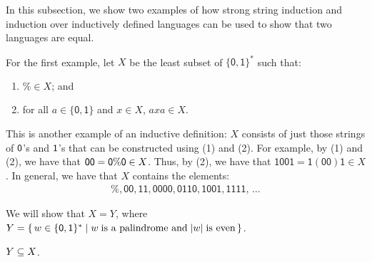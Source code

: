 In this subsection, we show two examples of how strong string induction
and induction over inductively defined languages can be used to
show that two languages are equal.

For the first example, let $X$ be the least subset of
$\{\mathsf{0,1}\}^*$ such that:
\begin{enumerate}[\quad(1)]
\item $\%\in X$; and

\item for all $a\in\{\mathsf{0,1}\}$ and $x\in X$, $axa\in X$.
\end{enumerate}
This is another example of an inductive definition:
%
$X$ consists of just those strings of $\mathsf{0}$'s and $\mathsf{1}$'s that
can be constructed using (1) and (2).  For example, by (1) and (2), we
have that $\mathsf{0}\mathsf{0}=\mathsf{0}\%\mathsf{0}\in X$.  Thus, by (2), we have
that $\mathsf{1001=1(00)1}\in X$.  In general, we have that $X$
contains the elements:
\begin{gather*}
\mathsf{\%, 00, 11, 0000, 0110, 1001, 1111,\,\ldots}
\end{gather*}

We will show that $X=Y$, where
%
%
$Y=\{ \, w\in\{\mathsf{0,1}\}^* \mid w\;\allowbreak\mbox{is a palindrome and}\allowbreak\;|w|
\;\allowbreak\mbox{is even}\allowbreak \, \}$.

\begin{lemma}
\label{SSIProp1Lem1}
$Y\subseteq X$.
\end{lemma}

